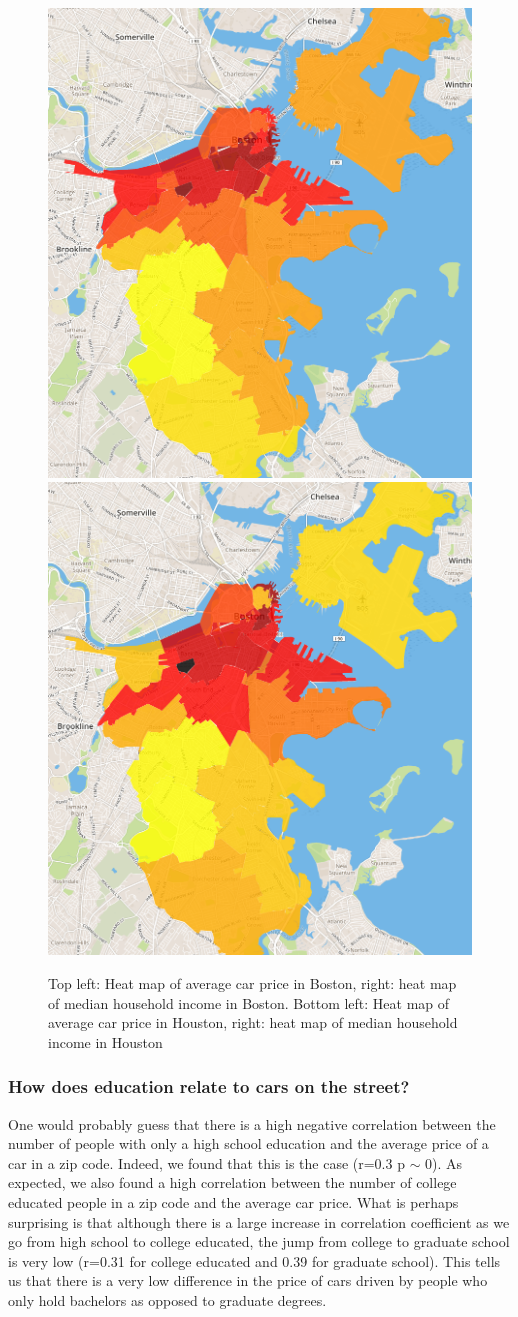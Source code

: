 \documentclass[10pt,twocolumn,letterpaper]{article}
\begin{document}
\begin{figure}[t]
\begin{center}
    \includegraphics[width=0.45\linewidth]{img/price.png}
    \includegraphics[width=0.45\linewidth]{img/income.png}
\end{center}
   \caption {Top left: Heat map of average car price in Boston, right: heat map of median household income in Boston. Bottom left: Heat map of average car price in Houston, right: heat map of median household income in Houston}
\label{fig:bos-sf-vis}
\end{figure}

\subsubsection{How does education relate to cars on the street?}
One would probably guess that there is a high negative correlation between the number of people with only a high school education and the average price of a car in a zip code. Indeed, we found that this is the case (r=0.3 p \(\sim\) 0). As expected, we also found a high correlation between the number of college educated people in a zip code and the average car price. What is perhaps surprising is that although there is a large increase in correlation coefficient as we go from high school to college educated, the jump from college to graduate school is very low (r=0.31 for college educated and 0.39 for graduate school). This tells us that there is a very low difference in the price of cars driven by people who only hold bachelors as opposed to graduate degrees.
\end{document}
